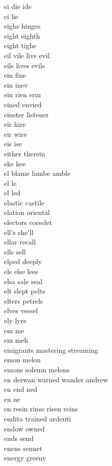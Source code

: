 ei die ide \\
ei lie \\
eighs hinges \\
eight eighth \\
eight tighe\\
eil vile live evil \\
eils lives evils \\
ein fine \\
ein inev \\
ein rien erin \\
eined envied \\
einster listener \\
eir hire \\
eir wire \\
eis ise\\
either therein \\
eke kee\\
el blame lambe amble   \\
el le\\
el led \\
elastic castile\\
elation oriental \\
electors corselet\\
ell's she'll \\
ellar recall \\
ells sell\\
elped deeply \\
els else lees \\
elsa sale seal\\
elt slept pelts  \\
elters petrels \\
elves vessel \\
ely lyre \\
em me\\
em meh \\
emigrants mastering streaming\\
emon melon \\
emons solemn melons \\
en derwan warned wander andrew    \\
en end ned \\
en ne\\
en resin rinse risen reins   \\
endita trained ardenti \\
endow owned\\
ends send\\
enens sennet \\
energy greeny\\
